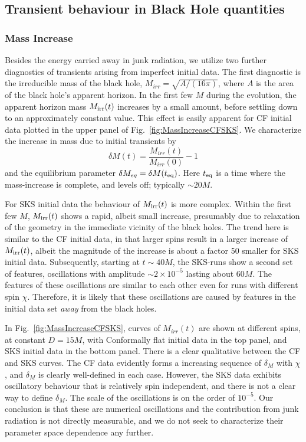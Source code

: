 \subsection{Transient behaviour in Black Hole quantities}

\subsubsection{Mass Increase}
Besides the energy carried away in junk radiation, we utilize two further
diagnostics of transients arising from imperfect initial data.
The first diagnostic is the irreducible
mass of the black hole, $M_{irr} = \sqrt{A/(16\pi)}$, where $A$
is the area of the black hole's apparent horizon. 
In the first few $M$ during the evolution, the apparent horizon mass
$M_{\rm irr}(t)$ increases by a small amount, before settling down to
an approximately constant value. This effect is easily apparent for CF initial data plotted in the upper panel of Fig.~\ref{fig:MassIncreaseCFSKS}.
We characterize the increase in mass due to initial transients by 
\begin{equation}
\delta M(t)=\frac{M_{irr}(t)}{M_{irr}(0)}-1
\end{equation}
and the equilibrium parameter $\delta M_{eq} = \delta M(t_{\rm eq})$.
Here $t_{\rm eq}$ is a time where the mass-increase is complete, and
levels off; typically $\sim20M$. 

For SKS initial data the behaviour of $M_{\rm irr}(t)$ is more
  complex.  Within the first few $M$, $M_{\rm irr}(t)$ shows a rapid,
  albeit small increase, presumably due to relaxation of the geometry
  in the immediate vicinity of the black holes.  The trend here is
  similar to the CF initial data, in that larger spins result in a
  larger increase of $M_{\rm irr}(t)$, albeit the magnitude of the
  increase is about a factor 50 smaller for SKS initial data.
  Subsequently, starting at $t\sim 40M$, the SKS-runs show a second
  set of features, oscillations with amplitude $\sim 2\times 10^{-5}$ lasting about
  $60M$.  The features of these oscillations are similar to each other even for runs with different spin $\chi$.  Therefore, it is
  likely that these oscillations are caused by features in the initial
  data set {\it away} from the black holes.

In Fig.~\ref{fig:MassIncreaseCFSKS}, curves of $M_{irr}(t)$ are
shown at different spins, at constant $D=15M$, with Conformally flat
initial data in the top panel, and SKS initial data in the bottom
panel. There is a clear qualitative between the CF and SKS curves. The CF data evidently forms a increasing sequence of $\delta_M$ with
$\chi$, and $\delta_M$ is clearly well-defined in each case. However,
the SKS data exhibits oscillatory behaviour that is relatively spin
independent, and there is not a clear way to define $\delta_M$. The
scale of the oscillations is on the order of $10^{-5}$. Our conclusion
is that these are numerical oscillations and the contribution from
junk radiation is not directly measurable, and we do not seek to
characterize their parameter space dependence any further.

